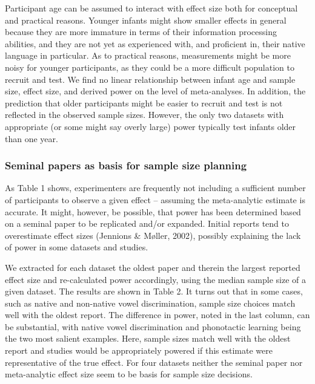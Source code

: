 \documentclass[english,floatsintext,man]{apa6}
\begin{document}
Participant age can be assumed to interact with effect size both for
conceptual and practical reasons. Younger infants might show smaller
effects in general because they are more immature in terms of their
information processing abilities, and they are not yet as experienced
with, and proficient in, their native language in particular. As to
practical reasons, measurements might be more noisy for younger
participants, as they could be a more difficult population to recruit
and test. We find no linear relationship between infant age and sample
size, effect size, and derived power on the level of meta-analyses. In
addition, the prediction that older participants might be easier to
recruit and test is not reflected in the observed sample sizes. However,
the only two datasets with appropriate (or some might say overly large)
power typically test infants older than one year.

\subsubsection{Seminal papers as basis for sample size
planning}\label{seminal-papers-as-basis-for-sample-size-planning}

As Table 1 shows, experimenters are frequently not including a
sufficient number of participants to observe a given effect -- assuming
the meta-analytic estimate is accurate. It might, however, be possible,
that power has been determined based on a seminal paper to be replicated
and/or expanded. Initial reports tend to overestimate effect sizes
(Jennions \& Møller, 2002), possibly explaining the lack of power in
some datasets and studies.

We extracted for each dataset the oldest paper and therein the largest
reported effect size and re-calculated power accordingly, using the
median sample size of a given dataset. The results are shown in Table 2.
It turns out that in some cases, such as native and non-native vowel
discrimination, sample size choices match well with the oldest report.
The difference in power, noted in the last column, can be substantial,
with native vowel discrimination and phonotactic learning being the two
most salient examples. Here, sample sizes match well with the oldest
report and studies would be appropriately powered if this estimate were
representative of the true effect. For four datasets neither the seminal
paper nor meta-analytic effect size seem to be basis for sample size
decisions.
\end{document}
